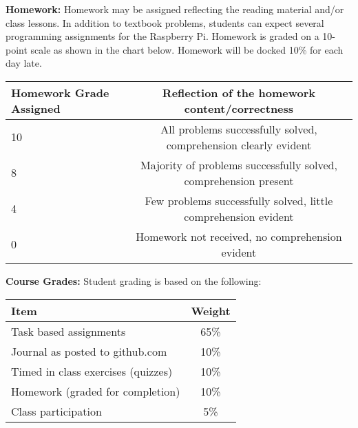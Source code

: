\documentclass[12pt]{article}
\begin{document}
\vspace*{.15in}
\textbf{Homework:}  Homework may be assigned reflecting the reading material and/or class lessons.  In addition to textbook problems, students can expect several programming assignments for the Raspberry Pi.  Homework is graded on a 10-point scale as shown in the chart below.  Homework will be docked 10\% for each day late.

    \begin{center}
        \begin{tabular}{ | l | c | }
            \hline
            \textbf{Homework Grade Assigned} & \textbf{Reflection of the homework content/correctness} \\ \hline
            10 & All problems successfully solved, comprehension clearly evident\\ \hline
            8 & Majority of problems successfully solved, comprehension present\\ \hline
            4 & Few problems successfully solved, little comprehension evident \\ \hline
            0 &  Homework not received, no comprehension evident\\
            \hline
        \end{tabular}
    \end{center}




\newpage
\vspace*{.15in}
\noindent\textbf{Course Grades:} Student grading is based on the following:

\begin{center}
     \begin{tabular}{ | l | c | }
        \hline
        \textbf{Item} & \textbf{Weight}                        \\
    \hline
        Task based assignments              & 65\%             \\
        Journal as posted to github.com     & 10\%             \\
        Timed in class exercises (quizzes)  & 10\%             \\
        Homework (graded for completion)    & 10\%             \\
        Class participation                 & 5\%              \\
    \hline
    \end{tabular}
\end{center}
\end{document}
